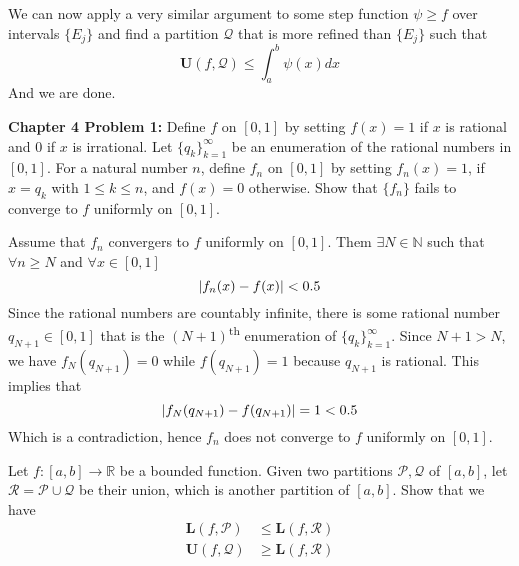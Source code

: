 \documentclass[11pt]{article}
\DeclarePairedDelimiter{\card}{\lvert}{\rvert}
\newcommand{\R}{\mathbb{R}}
\newcommand{\N}{\mathbb{N}}
\newcommand{\Par}{\mathcal{P}}
\newcommand{\aR}{\mathcal{R}}
\newcommand{\Qu}{\mathcal{Q}}
\newcommand{\Lo}{\mathbf{L}}
\newcommand{\U}{\mathbf{U}}
\begin{document}
    We can now apply a very similar argument to some step function $\psi \geq f$ over intervals $\{E_j\}$ and find a partition $\Qu$ that is more refined than $\{E_j\}$ such that
    \[
        \U (f,\Qu) \leq \int_{a}^{b} \psi(x) dx
    \]
    And we are done.

    \clearpage

    \begin{mybox}
        \textbf{Chapter 4 Problem 1:} Define $f$ on $[0,1]$ by setting $f(x) = 1$ if $x$ is rational and $0$ if $x$ is irrational.
        Let $\{q_k\}_{k=1}^{\infty}$ be an enumeration of the rational numbers in $[0,1]$.
        For a natural number $n$, define $f_n$ on $[0,1]$ by setting $f_n (x) = 1$, if $x = q_k$ with $1 \leq k \leq n$, and $f(x) = 0$ otherwise.
        Show that $\{f_n\}$ fails to converge to $f$ uniformly on $[0,1]$.
    \end{mybox}

    Assume that $f_n$ convergers to $f$ uniformly on $[0,1]$.
    Them $\exists N \in \N$ such that $\forall n \geq N$ and $\forall x \in [0,1]$
    \[
        \card{f_n (x) - f(x)} < 0.5
    \]
    Since the rational numbers are countably infinite, there is some rational number $q_{N+1} \in [0,1]$ that is the $(N+1)$\textsuperscript{th} enumeration of $\{q_{k}\}_{k=1} ^{\infty}$.
    Since $N+1 > N$, we have $f_N (q_{N+1}) = 0$ while $f(q_{N+1}) = 1$ because $q_{N+1}$ is rational.
    This implies that
    \[
        \card{f_N (q_{N+1}) - f(q_{N+1})} = 1 < 0.5
    \]
    Which is a contradiction, hence $f_n$ does not converge to $f$ uniformly on $[0,1]$.

    \clearpage

    \begin{mybox}
        Let $f: [a,b] \rightarrow \R$ be a bounded function.
        Given two partitions $\Par, \Qu$ of $[a,b]$, let $\aR = \Par \cup \Qu$ be their union, which is another partition of $[a,b]$.
        Show that we have
        \begin{align*}
            \Lo (f, \Par) &\leq \Lo (f, \aR) \\
            \U (f, \Qu) &\geq \Lo (f, \aR) \\
        \end{align*}
    \end{mybox}
\end{document}
